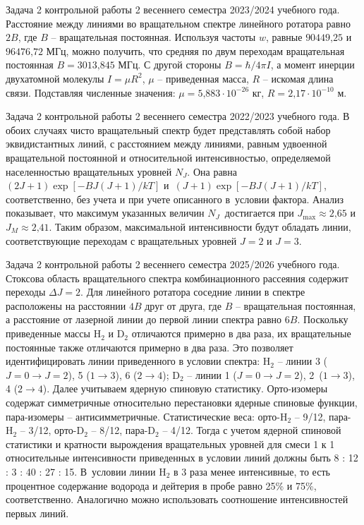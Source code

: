  Задача 2 контрольной работы 2 весеннего семестра 2023/2024 учебного года. Расстояние между линиями во вращательном спектре линейного ротатора равно $2B$, где $B$ – вращательная постоянная. Используя частоты $w$, равные $\text{90449,25}$ и~$\text{96476,72}$ МГц, можно получить, что средняя по двум переходам вращательная постоянная $B=\text{3013,845}$ МГц. С другой стороны $B=\hbar/4\pi I$, а момент инерции двухатомной молекулы $I=\mu R^2$, $\mu$ – приведенная масса, $R$ – искомая длина связи. Подставляя численные значения: $\mu=\text{5,883}\cdot \text{10}^{-\text{26}}$ кг, $R=2\text{,}17\cdot\text{10}^{-\text{10}}$ м. \par
{} Задача 2 контрольной работы 2 весеннего семестра 2022/2023 учебного года. В обоих случаях чисто вращательный спектр будет представлять собой набор эквидистантных линий, с расстоянием между линиями, равным удвоенной вращательной постоянной и относительной интенсивностью, определяемой населенностью вращательных уровней $N_J$. Она равна $(2J+1)\exp[-BJ(J+1)/kT]$ и~$(J+1)\exp[-BJ(J+1)/kT]$, соответственно, без учета и при учете описанного в~условии фактора. Анализ показывает, что максимум указанных величин $N_J$~достигается при $J_{\text{max}}\approx 2\text{,}65$ и $J_{M}\approx 2\text{,}41$. Таким образом, максимальной интенсивности будут обладать линии, соответствующие переходам с вращательных уровней $J=2$ и $J=3$.\par
{} Задача 2 контрольной работы 2 весеннего семестра 2025/2026 учебного года. Стоксова область вращательного спектра комбинационного рассеяния содержит переходы $\Delta J = 2$. Для линейного ротатора соседние линии в спектре расположены на расстоянии $4B$ друг от друга, где $B$ – вращательная постоянная, а расстояние от лазерной линии до первой линии спектра равно $6B$. Поскольку приведенные массы $\text{H}_{2}$ и $\text{D}_{2}$ отличаются примерно в два раза, их вращательные постоянные также отличаются примерно в два раза. Это позволяет идентифицировать линии приведенного в условии спектра: $\text{H}_{2}$ – линии 3 ($J=0 \rightarrow J = 2$), 5 ($1 \rightarrow 3$), 6 ($2 \rightarrow 4$); $\text{D}_{2}$ – линии 1 ($J=0 \rightarrow J = 2$), 2~($1 \rightarrow 3$), 4 ($2 \rightarrow 4$). Далее учитываем ядерную спиновую статистику. Орто-изомеры содержат симметричные относительно перестановки ядерные спиновые функции, пара-изомеры – антисимметричные. Статистические веса: орто-$\text{H}_{2}$ – 9/12, пара-$\text{H}_{2}$ – 3/12, орто-$\text{D}_{2}$ – 8/12, пара-$\text{D}_{2}$ – 4/12. Тогда с учетом ядерной спиновой статистики и кратности вырождения вращательных уровней для смеси 1 к 1 относительные интенсивности приведенных в условии линий должны быть 8 : 12 : 3 : 40 : 27 : 15. В~условии линии $\text{H}_{2}$ в 3 раза менее интенсивные, то есть процентное содержание водорода и дейтерия в пробе равно 25\% и 75\%, соответственно. Аналогично можно использовать соотношение интенсивностей первых линий.\par
\newpage




